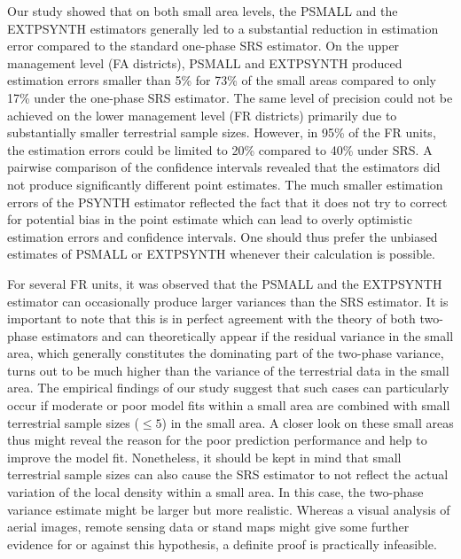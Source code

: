 \documentclass[remotesensing,article,submit,moreauthors,pdftex,10pt,a4paper]{mdpi}
\newcommand{\psynth}{PSYNTH}
\newcommand{\psmall}{PSMALL}
\newcommand{\extpsynth}{EXTPSYNTH}
\begin{document}
%

Our study showed that on both small area levels, the \psmall{} and the \extpsynth{} estimators generally led to a substantial reduction in estimation error compared to the standard one-phase SRS estimator. On the upper management level (FA districts), \psmall{} and \extpsynth{} produced estimation errors smaller than 5\% for 73\% of the small areas compared to only 17\% under the one-phase SRS estimator. The same level of precision could not be achieved on the lower management level (FR districts) primarily due to substantially smaller terrestrial sample sizes. However, in 95\% of the FR units, the estimation errors could be limited to 20\% compared to 40\% under SRS. A pairwise comparison of the confidence intervals revealed that the estimators did not produce significantly different point estimates. The much smaller estimation errors of the \psynth{} estimator reflected the fact that it does not try to correct for potential bias in the point estimate which can lead to overly optimistic estimation errors and confidence intervals. One should thus prefer the unbiased estimates of \psmall{} or \extpsynth{} whenever their calculation is possible.\par

For several FR units, it was observed that the \psmall{} and the \extpsynth{} estimator can occasionally produce larger variances than the SRS estimator. It is important to note that this is in perfect agreement with the theory of both two-phase estimators and can theoretically appear if the residual variance in the small area, which generally constitutes the dominating part of the two-phase variance, turns out to be much higher than the variance of the terrestrial data in the small area. The empirical findings of our study suggest that such cases can particularly occur if moderate or poor model fits within a small area are combined with small terrestrial sample sizes ($\leq 5$) in the small area. A closer look on these small areas thus might reveal the reason for the poor prediction performance and help to improve the model fit. Nonetheless, it should be kept in mind that small terrestrial sample sizes can also cause the SRS estimator to not reflect the actual variation of the local density within a small area. In this case, the two-phase variance estimate might be larger but more realistic. Whereas a visual analysis of aerial images, remote sensing data or stand maps might give some further evidence for or against this hypothesis, a definite proof is practically infeasible.\par
\end{document}
